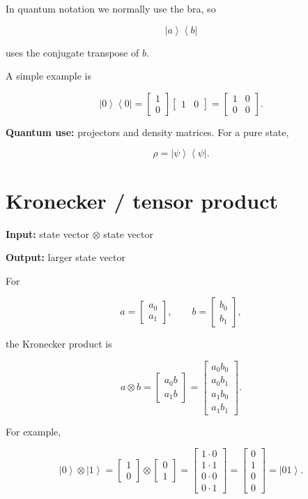 \documentclass[11pt,a4paper]{article}
\newcommand{\ket}[1]{\left|#1\right\rangle}
\newcommand{\bra}[1]{\left\langle#1\right|}
\begin{document}
In quantum notation we normally use the bra, so

\[
\ket{a}\bra{b}
\]

uses the conjugate transpose of $b$.

A simple example is

\[
\ket{0}\bra{0}
=
\begin{bmatrix}
1\\0
\end{bmatrix}
\begin{bmatrix}
1 & 0
\end{bmatrix}
=
\begin{bmatrix}
1 & 0\\
0 & 0
\end{bmatrix}.
\]

\textbf{Quantum use:} projectors and density matrices. For a pure state,

\[
\rho = \ket{\psi}\bra{\psi}.
\]

\section{Kronecker / tensor product}

\textbf{Input:} state vector $\otimes$ state vector

\textbf{Output:} larger state vector

For

\[
a =
\begin{bmatrix}
a_0\\a_1
\end{bmatrix},
\qquad
b =
\begin{bmatrix}
b_0\\b_1
\end{bmatrix},
\]

the Kronecker product is

\[
a\otimes b
=
\begin{bmatrix}
a_0 b\\
a_1 b
\end{bmatrix}
=
\begin{bmatrix}
a_0b_0\\
a_0b_1\\
a_1b_0\\
a_1b_1
\end{bmatrix}.
\]

For example,

\[
\ket{0}\otimes\ket{1}
=
\begin{bmatrix}
1\\0
\end{bmatrix}
\otimes
\begin{bmatrix}
0\\1
\end{bmatrix}
=
\begin{bmatrix}
1\cdot0\\
1\cdot1\\
0\cdot0\\
0\cdot1
\end{bmatrix}
=
\begin{bmatrix}
0\\1\\0\\0
\end{bmatrix}
=
\ket{01}.
\]
\end{document}
